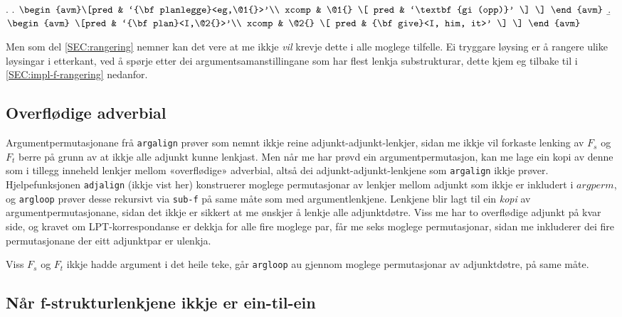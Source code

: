 \documentclass[12pt,a4paper,oneside,draft]{report}
\newcommand{\p}[1]{`\textbf{#1}'}
\begin{document}
{\avmoptions{}
\ex. \a.  $\begin{avm}\[pred & `{\bf planlegge}<eg,\@1{}>'\\
   xcomp & \@1{} \[  pred & \p{gi (opp)} \] \] \end{avm}$
  \b. $\begin{avm} \[pred & `{\bf plan}<I,\@2{}>'\\
   xcomp & \@2{} \[  pred & {\bf give}<I, him, it>' \] \] \end{avm}$

}

Men som del \ref{SEC:rangering} nemner kan det vere at me ikkje \emph{vil}
krevje dette i alle moglege tilfelle. Ei tryggare løysing er å rangere
ulike løysingar i etterkant, ved å spørje etter dei
argumentsamanstillingane som har flest lenkja substrukturar, dette
kjem eg tilbake til i \ref{SEC:impl-f-rangering} nedanfor.
\subsection{Overflødige adverbial}
\label{sec-4.1.1}

   \label{SEC:impl-adjalign}

Argumentpermutasjonane frå \texttt{argalign} prøver som nemnt ikkje reine
adjunkt-adjunkt-lenkjer, sidan me ikkje vil forkaste lenking av $F_s$
og $F_t$ berre på grunn av at ikkje alle adjunkt kunne lenkjast. Men
når me har prøvd ein argumentpermutasjon, kan me lage ein kopi av
denne som i tillegg inneheld lenkjer mellom «overflødige» adverbial,
altså dei adjunkt-adjunkt-lenkjene som \texttt{argalign} ikkje
prøver. Hjelpefunksjonen \texttt{adjalign} (ikkje vist her) konstruerer
moglege permutasjonar av lenkjer mellom adjunkt som ikkje er inkludert
i $argperm$, og \texttt{argloop} prøver desse rekursivt via \texttt{sub-f} på same
måte som med argumentlenkjene. Lenkjene blir lagt til ein \emph{kopi} av
argumentpermutasjonane, sidan det ikkje er sikkert at me ønskjer å
lenkje alle adjunktdøtre. Viss me har to overflødige adjunkt på kvar
side, og kravet om LPT\hyp{}korrespondanse er dekkja for alle fire moglege
par, får me seks moglege permutasjonar, sidan me inkluderer dei fire
permutasjonane der eitt adjunktpar er ulenkja.

Viss $F_s$ og $F_t$ ikkje hadde argument i det heile teke, går
\texttt{argloop} au gjennom moglege permutasjonar av adjunktdøtre, på same
måte.
\subsection{Når f\hyp{}strukturlenkjene ikkje er ein-til-ein}
\label{sec-4.1.2}
\end{document}
